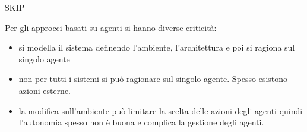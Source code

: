 \begin{definizione} 
    SKIP
\end{definizione}

Per gli approcci basati su agenti si hanno diverse criticità:
\begin{itemize}
    \item si modella il sistema definendo l'ambiente, l'architettura e poi 
    si ragiona sul singolo agente
    \item non per tutti i sistemi si può ragionare sul singolo agente. Spesso
    esistono azioni esterne.
    \item la modifica sull'ambiente può limitare la scelta delle azioni degli agenti
    quindi l'autonomia spesso non è buona e complica la gestione degli agenti.
\end{itemize}

